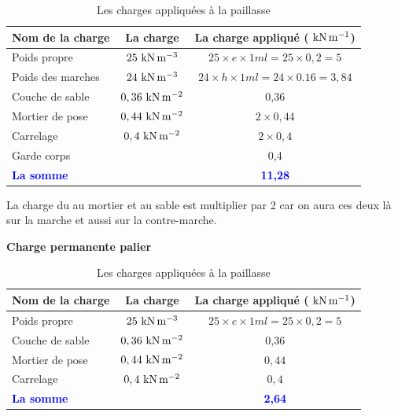 \begin{table}[H]
	\centering
	\caption{Les charges appliquées à la paillasse}
	\begin{tabular}{|l|c|c|}
		\hline
		\textbf{Nom de la charge} & \textbf{La charge} & \textbf{La charge appliqué}
		($\knm$) \\ \hline
		
		Poids propre & $25\knmc$ & $25 \times e \times 1ml = 25 \times 0,2 = 5$ \\
		\hline
		
		Poids des marches & $24\knmc$ & $24 \times h \times 1ml = 24 \times 0.16 =
		3,84 $ \\ \hline
		
		Couche de sable & $0,36\knms$ & 0,36 \\ \hline
		
		Mortier de pose & $0,44\knms$ & $2 \times 0,44$ \\ \hline
		
		Carrelage & $0,4\knms$ & $2 \times 0,4$ \\ \hline
		
		Garde corps & & 0,4 \\ \hline
		
		\multicolumn{2}{|l|}{\textbf{\textcolor{blue}{La somme}}} 
		& \textbf{\textcolor{blue}{11,28}} \\ \hline
		
		
	\end{tabular}
\end{table}



La charge du au mortier et au sable est multiplier par 2 car on aura ces deux
là sur la marche et aussi sur la contre-marche.





\vspace{\baselineskip}

\textbf{Charge permanente palier}


\begin{table}[H]
	\centering
	\caption{Les charges appliquées à la paillasse}
	\begin{tabular}{|l|c|c|}
		\hline
		\textbf{Nom de la charge} & \textbf{La charge} & \textbf{La charge appliqué}
		($\knm$) \\ \hline
		
		Poids propre & $25\knmc$ & $25 \times e \times 1ml = 25 \times 0,2 = 5$ \\
		\hline
		
		
		Couche de sable & $0,36\knms$ & 0,36 \\ \hline
		
		Mortier de pose & $0,44\knms$ & $0,44$ \\ \hline
		
		Carrelage & $0,4\knms$ & $0,4$ \\ \hline
		
		
		\multicolumn{2}{|l|}{\textbf{\textcolor{blue}{La somme}}} 
		& \textbf{\textcolor{blue}{2,64}} \\ \hline
		
		
	\end{tabular}
\end{table}



